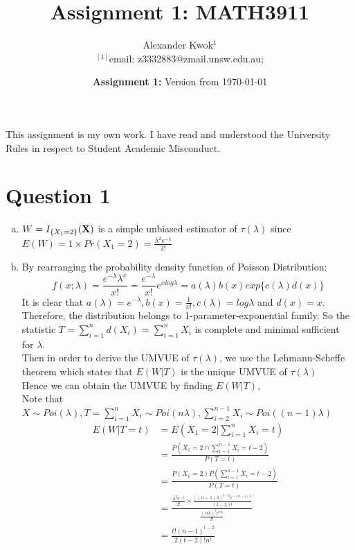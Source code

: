 \documentclass[a4paper,11pt]{article}
\begin{document}
\title{Assignment 1: MATH3911}
\author{Alexander Kwok$^{1}$  
\\$^{[1]}${\small email:
z3332883@zmail.unsw.edu.au; } 
}

\date{\textbf{Assignment 1:} Version from \today }

\maketitle
This assignment is my own work. I have read and understood the University Rules in respect to Student Academic Misconduct.
\section{Question 1}
\begin{enumerate}[(a)]
	\item
		$W = I_{\{X_1=2 \}}(\bf{X})$ is a simple unbiased estimator of $\tau (\lambda)$ since $E(W)= 1\times Pr(X_1=2) = \frac{\lambda^2e^{-\lambda}}{2!}$
	\item
		By rearranging the probability density function of Poisson Distribution:
		\[f(x;\lambda)=\frac{e^{-\lambda}\lambda^x}{x!} = \frac{e^{-\lambda}}{x!}e^{xlog\lambda} =a(\lambda)b(x)exp\{c(\lambda)d(x)\}
		\]
		It is clear that $a(\lambda) = e^{-\lambda}, b(x) = \frac{1}{x!}, c(\lambda) = log \lambda$ and $d(x) = x$. Therefore, the distribution belongs to 1-parameter-exponential family. So the statistic $T = \sum^n_{i=1} d(X_i) = \sum^n_{i=1} X_i$ is complete and minimal sufficient for $\lambda$.
		\\Then in order to derive the UMVUE of $\tau (\lambda)$, we use the Lehmann-Scheffe theorem which states that $E(W|T)$ is the unique UMVUE of  $\tau (\lambda)$
		\\Hence we can obtain the UMVUE by finding $E(W|T)$,
		\\Note that $X \sim Poi(\lambda) , T =  \sum^n_{i=1} X_i \sim Poi(n\lambda) ,  \sum^{n-1}_{i=2} X_i \sim Poi((n-1)\lambda)$
		\begin{align*}
			E(W|T=t) &= E(X_1=2 |  \sum^n_{i=1} X_i=t) \\
			&= \frac{P(X_1=2  \cap \sum^{n-1}_{i=1} X_i=t-2)}{P(T=t)}\\
			&= \frac{P(X_1=2 )P( \sum^{n-1}_{i=1} X_i=t-2)}{P(T=t)}\\
			&= \frac{ \frac{\lambda^2e^{-\lambda}}{2!} \times  \frac{[(n-1)\lambda]^{t-2}e^{-(n-1)\lambda}}{(t-2)!}}{ \frac{(n\lambda)^te^{n\lambda}}{t!}}\\
			&= \frac{t!(n-1)^{t-2}}{2(t-2)!n^t}\\

\end{align*}
\end{enumerate}
\end{document}
